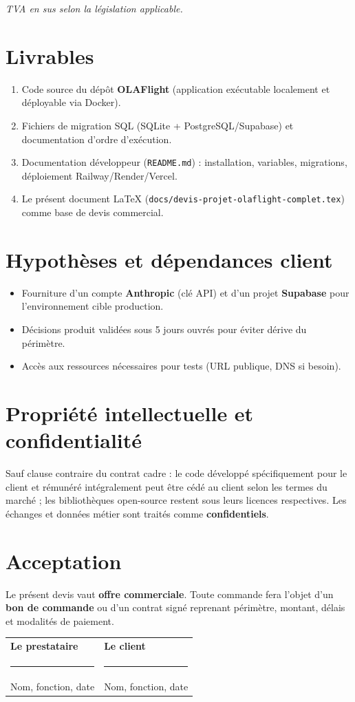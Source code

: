 \documentclass[11pt,a4paper]{article}
\begin{document}
\noindent\textit{TVA en sus selon la législation applicable.}

\section{Livrables}
\begin{enumerate}[leftmargin=*]
  \item Code source du dépôt \textbf{OLAFlight} (application exécutable localement et déployable via Docker).
  \item Fichiers de migration SQL (SQLite + PostgreSQL/Supabase) et documentation d'ordre d'exécution.
  \item Documentation développeur (\texttt{README.md}) : installation, variables, migrations, déploiement Railway/Render/Vercel.
  \item Le présent document LaTeX (\texttt{docs/devis-projet-olaflight-complet.tex}) comme base de devis commercial.
\end{enumerate}

\section{Hypothèses et dépendances client}
\begin{itemize}[leftmargin=*]
  \item Fourniture d'un compte \textbf{Anthropic} (clé API) et d'un projet \textbf{Supabase} pour l'environnement cible production.
  \item Décisions produit validées sous 5 jours ouvrés pour éviter dérive du périmètre.
  \item Accès aux ressources nécessaires pour tests (URL publique, DNS si besoin).
\end{itemize}

\section{Propriété intellectuelle et confidentialité}
Sauf clause contraire du contrat cadre : le code développé spécifiquement pour le client et rémunéré intégralement peut être cédé au client selon les termes du marché ; les bibliothèques open-source restent sous leurs licences respectives. Les échanges et données métier sont traités comme \textbf{confidentiels}.

\section{Acceptation}
Le présent devis vaut \textbf{offre commerciale}. Toute commande fera l'objet d'un \textbf{bon de commande} ou d'un contrat signé reprenant périmètre, montant, délais et modalités de paiement.

\vspace{2em}
\noindent\begin{tabular}{@{}p{6.5cm}p{6.5cm}@{}}
\textbf{Le prestataire} & \textbf{Le client} \\[2.5cm]
\rule{6cm}{0.4pt} & \rule{6cm}{0.4pt} \\
Nom, fonction, date & Nom, fonction, date \\
\end{tabular}
\end{document}
